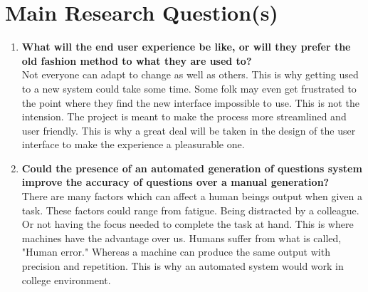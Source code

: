 \section{Main Research Question(s)}

\begin{enumerate}

	
	\item{\bfseries What will the end user experience be like, or will they prefer the old fashion method to what they are used to?} \\
	Not everyone can adapt to change as well as others. This is why getting used to a new system could take some time. Some folk may even get frustrated to the point where they find the new interface impossible to use. This is 	not the intension. The project is meant to make the process more streamlined and user friendly. This is why a great deal will be taken in the design of the user interface to make the experience a pleasurable one.
	
	\item{\bfseries Could the presence of an automated generation of questions system improve the accuracy of questions over a manual generation?} \\
	There are many factors which can affect a human beings output when given a task. These factors could range from fatigue. Being distracted by a colleague. Or not having the focus needed to complete the task at hand. This is 	where machines have the advantage over us. Humans suffer from what is called, "Human error." Whereas a machine can produce the same output with precision and repetition. This is why an automated system would work in college environment.
\end{enumerate}

